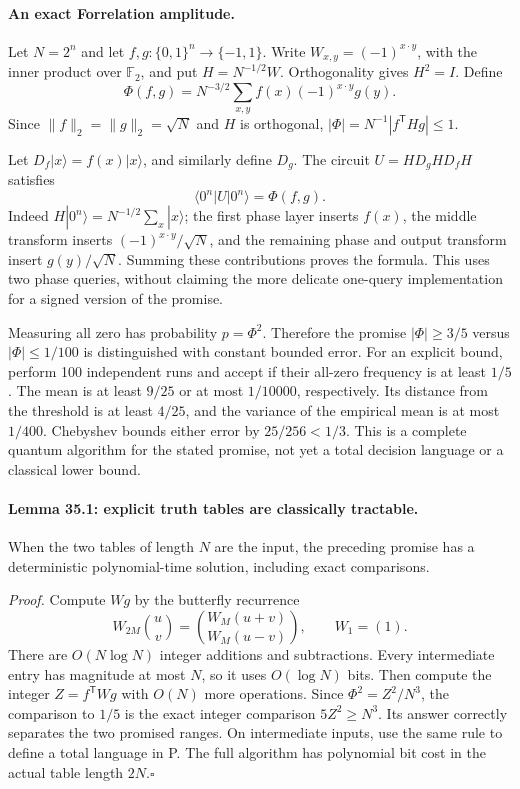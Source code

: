\documentclass[11pt]{article}
\begin{document}
\paragraph{An exact Forrelation amplitude.}
Let $N=2^n$ and let $f,g:\{0,1\}^n\to\{-1,1\}$. Write
$W_{x,y}=(-1)^{x\cdot y}$, with the inner product over $\mathbb F_2$,
and put $H=N^{-1/2}W$. Orthogonality gives $H^2=I$. Define
\begin{equation}\label{r35:phi}
 \Phi(f,g)=N^{-3/2}\sum_{x,y}f(x)(-1)^{x\cdot y}g(y).
\end{equation}
Since $\|f\|_2=\|g\|_2=\sqrt N$ and $H$ is orthogonal,
$|\Phi|=N^{-1}|f^{\mathsf T}Hg|\le1$.

Let $D_f|x\rangle=f(x)|x\rangle$, and similarly define $D_g$.
The circuit $U=HD_gHD_fH$ satisfies
\begin{equation}\label{r35:circuit}
                 \langle0^n|U|0^n\rangle=\Phi(f,g).
\end{equation}
Indeed $H|0^n\rangle=N^{-1/2}\sum_x|x\rangle$; the first phase layer
inserts $f(x)$, the middle transform inserts $(-1)^{x\cdot y}/\sqrt N$,
and the remaining phase and output transform insert $g(y)/\sqrt N$.
Summing these contributions proves the formula. This uses two phase
queries, without claiming the more delicate one-query implementation for
a signed version of the promise.

Measuring all zero has probability $p=\Phi^2$. Therefore the promise
$|\Phi|\ge3/5$ versus $|\Phi|\le1/100$ is distinguished with constant
bounded error. For an explicit bound, perform 100 independent runs and
accept if their all-zero frequency is at least $1/5$. The mean is at least
$9/25$ or at most $1/10000$, respectively. Its distance from the threshold
is at least $4/25$, and the variance of the empirical mean is at most
$1/400$. Chebyshev bounds either error by
$25/256<1/3$. This is a complete quantum algorithm for the stated promise,
not yet a total decision language or a classical lower bound.

\paragraph{Lemma 35.1: explicit truth tables are classically tractable.}
When the two tables of length $N$ are the input, the preceding promise has
a deterministic polynomial-time solution, including exact comparisons.

\emph{Proof.} Compute $Wg$ by the butterfly recurrence
\[
 W_{2M}\binom{u}{v}=\binom{W_M(u+v)}{W_M(u-v)},\qquad W_1=(1).
\]
There are $O(N\log N)$ integer additions and subtractions. Every
intermediate entry has magnitude at most $N$, so it uses $O(\log N)$
bits. Then compute the integer $Z=f^{\mathsf T}Wg$ with $O(N)$ more
operations. Since $\Phi^2=Z^2/N^3$, the comparison to $1/5$ is the exact
integer comparison $5Z^2\ge N^3$. Its answer correctly separates the two
promised ranges. On intermediate inputs, use the same rule to define a
total language in P. The full algorithm has polynomial bit cost in the
actual table length $2N$.\hfill$\square$
\end{document}
